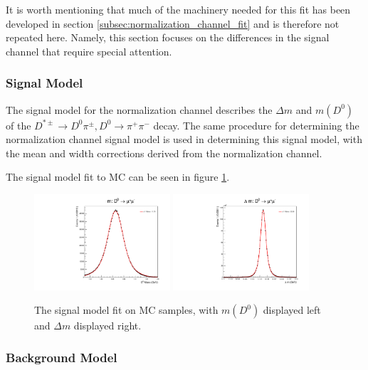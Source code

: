 It is worth mentioning that much of the machinery needed for this fit has been developed in section \ref{subsec:normalization_channel_fit} and is therefore not repeated here. Namely, this section focuses on the differences in the signal channel that require special attention.

\subsubsection{Signal Model}

The signal model for the normalization channel describes the $\Delta m$ and $m(D^0)$ of the $D^{*\pm}\to D^0 \pi^\pm, D^0 \to \pi^+ \pi^-$ decay. The same procedure for determining the normalization channel signal model is used in determining this signal model, with the mean and width corrections derived from the normalization channel.

The signal model fit to MC can be seen in figure \ref{fig:d0mumu_uml_fit}.

\begin{figure}[htp]
    \begin{center}
      \includegraphics[width=0.45\textwidth]{figures/chapter4/signal_fit/d0mm_2022_2023_0_m.pdf}
      \includegraphics[width=0.45\textwidth]{figures/chapter4/signal_fit/d0mm_2022_2023_0_dm.pdf}\\
    \end{center}
    \caption{
      The signal model fit on MC samples, with $m(D^0)$ displayed left and $\Delta m$ displayed right.
    }
    \label{fig:d0mumu_uml_fit}
\end{figure}

\subsubsection{Background Model}

